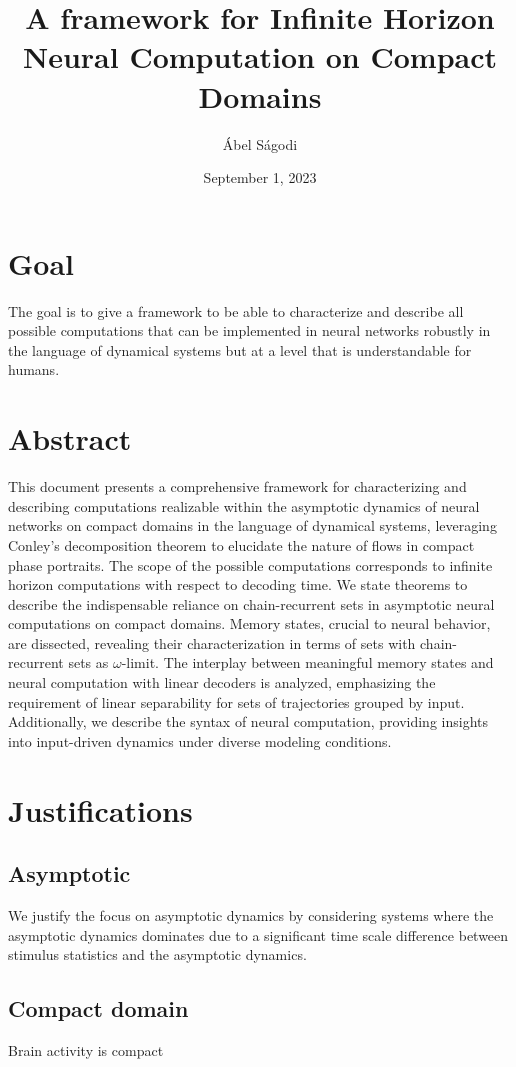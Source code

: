 \documentclass{scrartcl}
\title{A framework for Infinite Horizon Neural Computation on Compact Domains}
\author{\'Abel S\'agodi}
\date{September 1, 2023}
\theoremstyle{definition}
\theoremstyle{remark}
\begin{document}
\maketitle

\section{Goal}
The goal is to give a framework to be able to characterize and describe all possible computations that can be implemented in neural networks robustly in the language of dynamical systems but at a level that is understandable for humans.

\section{Abstract}
This document presents a comprehensive framework for characterizing and describing computations realizable within the asymptotic dynamics of neural networks on compact domains in the language of dynamical systems,  leveraging Conley's decomposition theorem to elucidate the nature of flows in compact phase portraits. The scope of the possible computations corresponds to infinite horizon computations with respect to decoding time. We state theorems to describe the indispensable reliance on chain-recurrent sets in asymptotic neural computations on compact domains. Memory states, crucial to neural behavior, are dissected, revealing their characterization in terms of sets with chain-recurrent sets as $\omega$-limit. The interplay between meaningful memory states and neural computation with linear decoders is analyzed, emphasizing the requirement of linear separability for sets of trajectories grouped by input. Additionally, we describe the syntax of neural computation, providing insights into input-driven dynamics under diverse modeling conditions. 


\section{Justifications}
\subsection{Asymptotic}
We justify the focus on asymptotic dynamics by considering systems where the asymptotic dynamics dominates due to a significant time scale difference between stimulus statistics and the asymptotic dynamics.

\subsection{Compact domain}
Brain activity is compact
\end{document}

